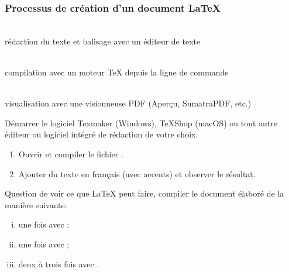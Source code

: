 \begin{frame}
  \frametitle{Processus de création d'un document {\LaTeX}}
  \Huge
  \begin{minipage}[t]{0.25\textwidth}
    \centering
    \faFile*[regular] \\ \bigskip
    \small
    rédaction du texte et balisage avec un \alert{éditeur de texte}
  \end{minipage}
  \hfill\faArrowRight\hfill
  \begin{minipage}[t]{0.25\textwidth}
    \centering
    \faCogs \\  \bigskip
    \small
    compilation avec un \alert{moteur} {\TeX} depuis la ligne de commande
  \end{minipage}
  \hfill\faArrowRight\hfill
  \begin{minipage}[t]{0.3\textwidth}
    \centering
    \faFilePdf[regular] \\  \bigskip
    \small
    visualisation avec une visionneuse PDF (Aperçu,
    SumatraPDF, etc.)
  \end{minipage}
\end{frame}

\begin{exercice}
  Démarrer le logiciel \alert{Texmaker} (Windows), \alert{TeXShop}
  (macOS) ou tout autre éditeur ou logiciel intégré de rédaction de
  votre choix.

  \begin{enumerate}
  \item Ouvrir et compiler le fichier .
  \item Ajouter du texte en français (avec accents) et observer le
    résultat.
  \end{enumerate}
\end{exercice}

\begin{exercice}
  Question de voir ce que {\LaTeX} peut faire, compiler le document
  élaboré  de la manière suivante:
  \begin{enumerate}[i)]
  \item une fois avec ;
  \item une fois avec ;
  \item deux à trois fois avec .
  \end{enumerate}
\end{exercice}

